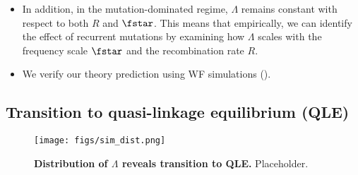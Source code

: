 \documentclass[aps,rmp,twocolumn,groupedaddress,floatfix,notitlepage]{revtex4-1}
\begin{document}
\begin{itemize}
    \item In addition, in the mutation-dominated regime, $\Lambda$ remains constant with respect to both $R$ and $\fstar$. This means that empirically, we can identify the effect of recurrent mutations by examining how $\Lambda$ scales with the frequency scale $\fstar$ and the recombination rate $R$.
    \item We verify our theory prediction using WF simulations ().
\end{itemize}

\newpage
\subsection*{Transition to quasi-linkage equilibrium (QLE)}

\begin{figure*}[t]
\centering
\texttt{[image: figs/sim\_dist.png]} 
\hfill
\caption{\textbf{Distribution of $\Lambda$ reveals transition to QLE.} Placeholder. \label{fig:sim_dist}}
\end{figure*}
\end{document}

